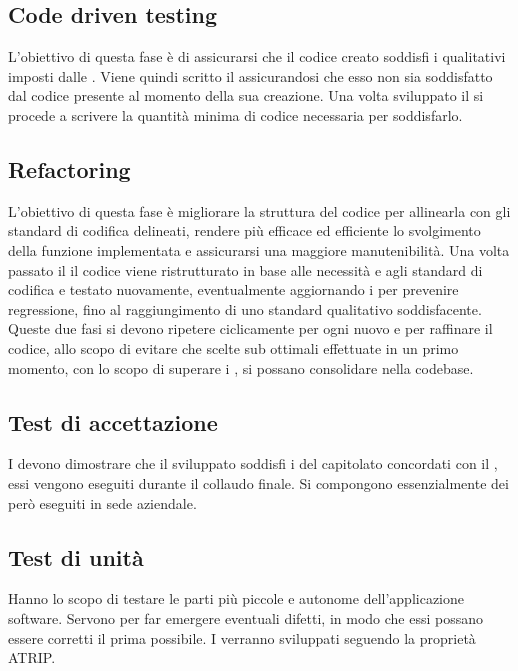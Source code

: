 \subsection{Code driven testing}
L'obiettivo di questa fase è di assicurarsi che il codice creato soddisfi i  qualitativi imposti dalle . Viene quindi scritto il  assicurandosi che esso non sia soddisfatto dal codice presente al momento della sua creazione. Una volta sviluppato il  si procede a scrivere la quantità minima di codice necessaria per soddisfarlo.
\subsection{Refactoring}
L'obiettivo di questa fase è migliorare la struttura del codice per allinearla con gli standard di codifica delineati, rendere più efficace ed efficiente lo svolgimento della funzione implementata e assicurarsi una maggiore manutenibilità. Una volta passato il  il codice viene ristrutturato in base alle necessità e agli standard di codifica e testato nuovamente, eventualmente aggiornando i  per prevenire regressione, fino al raggiungimento di uno standard qualitativo soddisfacente. \newline{}
\newline{}
Queste due fasi si devono ripetere ciclicamente per ogni nuovo  e per raffinare il codice, allo scopo di evitare che scelte sub ottimali effettuate in un primo momento, con lo scopo di superare i , si possano consolidare nella codebase.


\subsection{Test di accettazione}
I  devono dimostrare che il  sviluppato soddisfi i  del capitolato concordati con il , essi vengono eseguiti durante il collaudo finale.
Si compongono essenzialmente dei  però eseguiti in sede aziendale.

\subsection{Test di unità}
Hanno lo scopo di testare le parti più piccole e autonome dell'applicazione software. Servono per far emergere eventuali difetti, in modo che essi possano essere corretti il prima possibile.
I  verranno sviluppati seguendo la proprietà ATRIP.